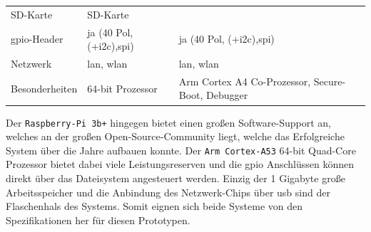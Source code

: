 \begin{longtable}[]{@{}lll@{}}
\begin{minipage}[t]{0.26\columnwidth}
SD-Karte\strut
\end{minipage} & \begin{minipage}[t]{0.49\columnwidth}\raggedright
SD-Karte\strut
\end{minipage}\tabularnewline
\begin{minipage}[t]{0.17\columnwidth}\raggedright
\gls{gpio}-Header\strut
\end{minipage} & \begin{minipage}[t]{0.26\columnwidth}\raggedright
ja (40 Pol, (+i2c),\gls{spi})\strut
\end{minipage} & \begin{minipage}[t]{0.49\columnwidth}\raggedright
ja (40 Pol, (+i2c),\gls{spi})\strut
\end{minipage}\tabularnewline
\begin{minipage}[t]{0.17\columnwidth}\raggedright
Netzwerk\strut
\end{minipage} & \begin{minipage}[t]{0.26\columnwidth}\raggedright
\gls{lan}, \gls{wlan}\strut
\end{minipage} & \begin{minipage}[t]{0.49\columnwidth}\raggedright
\gls{lan}, \gls{wlan}\strut
\end{minipage}\tabularnewline
\begin{minipage}[t]{0.17\columnwidth}\raggedright
Besonderheiten\strut
\end{minipage} & \begin{minipage}[t]{0.26\columnwidth}\raggedright
64-bit Prozessor\strut
\end{minipage} & \begin{minipage}[t]{0.49\columnwidth}\raggedright
Arm Cortex A4 Co-Prozessor, Secure-Boot, Debugger\strut
\end{minipage}\tabularnewline
\bottomrule
\end{longtable}

Der \passthrough{\lstinline!Raspberry-Pi 3b+!} hingegen bietet einen
großen Software-Support an, welches an der großen Open-Source-Community
liegt, welche das Erfolgreiche System über die Jahre aufbauen konnte.
Der \passthrough{\lstinline!Arm Cortex-A53!} 64-bit Quad-Core Prozessor
bietet dabei viele Leistungsreserven und die \gls{gpio} Anschlüssen
können direkt über das Dateisystem angesteuert werden. Einzig der 1
Gigabyte große Arbeitsspeicher und die Anbindung des Netzwerk-Chips über
\gls{usb} sind der Flaschenhals des Systems. Somit eignen sich beide
Systeme von den Spezifikationen her für diesen Prototypen.

